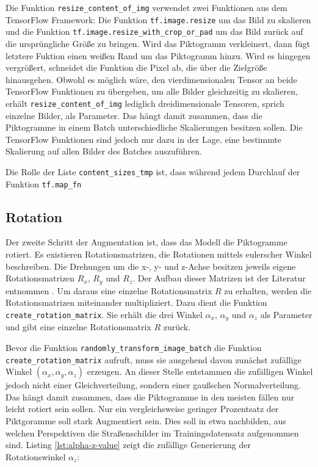 Die Funktion \texttt{resize_content_of_img} verwendet zwei Funktionen aus dem TensorFlow Framework: Die Funktion \texttt{tf.image.resize} um das Bild zu skalieren und die Funktion \texttt{tf.image.resize_with_crop_or_pad} um das Bild zurück auf die ursprüngliche Größe zu bringen. Wird das Piktogramm verkleinert, dann fügt letztere Fuktion einen weißen Rand um das Piktogramm hinzu. Wird es hingegen vergrößert, schneidet die Funktion die Pixel ab, die über die Zielgröße hinausgehen. Obwohl es möglich wäre, den vierdimensionalen Tensor an beide TensorFlow Funktionen zu übergeben, um alle Bilder gleichzeitig zu skalieren, erhält \texttt{resize_content_of_img} lediglich dreidimensionale Tensoren, sprich einzelne Bilder, als Parameter. Das hängt damit zusammen, dass die Piktogramme in einem Batch unterschiedliche Skalierungen besitzen sollen. Die TensorFlow Funktionen sind jedoch nur dazu in der Lage, eine bestimmte Skalierung auf allen Bilder des Batches auszuführen.

Die Rolle der Liste \texttt{content_sizes_tmp} ist, dass während jedem Durchlauf der Funktion \texttt{tf.map_fn}


\subsection{Rotation}
Der zweite Schritt der Augmentation ist, dass das Modell die Piktogramme rotiert. Es existieren Rotationsmatrizen, die Rotationen mittels eulerscher Winkel beschreiben. Die Drehungen um die x-, y- und z-Achse besitzen jeweils eigene Rotationsmatrizen $R_x$, $R_y$ und $R_z$. Der Aufbau dieser Matrizen ist der Literatur entnommen \cite{math-primer}. Um daraus eine einzelne Rotationsmatrix $R$ zu erhalten, werden die Rotationsmatrizen miteinander multipliziert. Dazu dient die Funktion \texttt{create_rotation_matrix}. Sie erhält die drei Winkel $\alpha_x$, $\alpha_y$ und $\alpha_z$ als Parameter und gibt eine einzelne Rotationsmatrix $R$ zurück.

Bevor die Funktion \texttt{randomly_transform_image_batch} die Funktion \texttt{create_rotation_matrix} aufruft, muss sie ausgehend davon zunächst zufällige Winkel $(\alpha_x, \alpha_y, \alpha_z)$ erzeugen. An dieser Stelle entstammen die zufälligen Winkel jedoch nicht einer Gleichverteilung, sondern einer gaußschen Normalverteilung. Das hängt damit zusammen, dass die Piktogramme in den meisten fällen nur leicht rotiert sein sollen. Nur ein vergleichsweise geringer Prozentsatz der Piktgoramme soll stark Augmentiert sein. Dies soll in etwa nachbilden, aus welchen Perspektiven die Straßenschilder im Trainingsdatensatz aufgenommen sind. Listing \ref{lst:alpha-z-value} zeigt die zufällige Generierung der Rotationswinkel $\alpha_z$:

